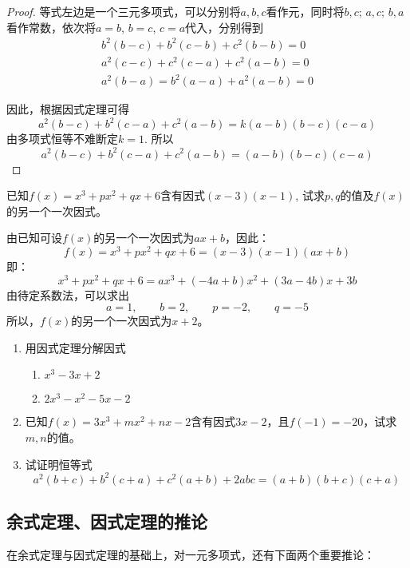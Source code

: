 \begin{proof}
等式左边是一个三元多项式，可以分别将$a,b,c$看作元，同时将$b,c$; $a,c$; $b,a$看作常数，依次将$a=b$, $b=c$, $c=a$代入，分别得到
\[\begin{split}
   b^2 (b-c) +b^2 (c-b) +c^2 (b-b) =0\\
   a^2 (c-c) +c^2 (c-a) +c^2 (a-b) =0\\
a^2(b-a)= b^2(a-a) + a^2(a-b) =0 
\end{split}\]

因此，根据因式定理可得
\[a^2 (b-c) +b^2 (c-a) +c^2 (a-b)=k (a-b) (b-c)(c-a)\]
由多项式恒等不难断定$k=1$. 所以
\[a^2 (b-c) +b^2 (c-a) +c^2 (a-b)
= (a-b) (b-c)(c-a)\]
\end{proof}

\begin{example}
    已知$f(x)=x^3+px^2+qx+6$含有因式$(x-3)(x-1)$, 试求$p,q$的值及$f(x)$的另一个一次因式。
\end{example}

\begin{solution}
    由已知可设$f(x)$的另一个一次因式为$ax+b$，因此：
\[f(x)=x^3+px^2+qx+6=(x-3)(x-1)(ax+b)\]
即：
\[x^3+px^2+qx+6=ax^3+(-4a+b)x^2+(3a-4b)x+3b\]
由待定系数法，可以求出
\[a=1,\qquad b=2,\qquad p=-2,\qquad q=-5\]
所以，$f(x)$的另一个一次因式为$x+2$。
\end{solution}

\begin{ex}
\begin{enumerate}
    \item 用因式定理分解因式
\begin{multicols}{2}
\begin{enumerate}
    \item $x^3-3x+2$
    \item $2x^3-x^2-5x-2$
\end{enumerate}
\end{multicols}
    \item 已知$f(x)=3x^3+mx^2+nx-2$含有因式$3x-2$，且$f(-1)=-20$，试求$m,n$的值。
    \item 试证明恒等式
\[a^2(b+c)+b^2(c+a)+c^2(a+b)+2abc=(a+b)(b+c)(c+a)\]
\end{enumerate}  
\end{ex}

\subsection{余式定理、因式定理的推论}

在余式定理与因式定理的基础上，对一元多项式，还有下面两个重要推论：

